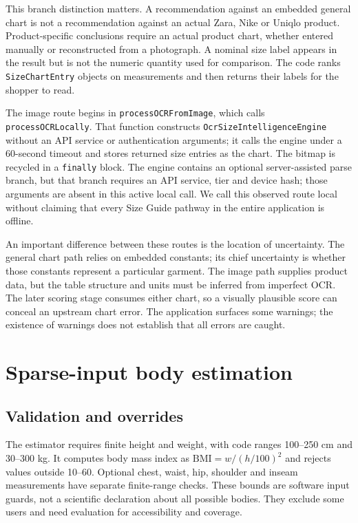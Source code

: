 \documentclass[11pt,a4paper]{article}
\begin{document}
This branch distinction matters. A recommendation against an embedded general chart is not a recommendation against an actual Zara, Nike or Uniqlo product. Product-specific conclusions require an actual product chart, whether entered manually or reconstructed from a photograph. A nominal size label appears in the result but is not the numeric quantity used for comparison. The code ranks \texttt{SizeChartEntry} objects on measurements and then returns their labels for the shopper to read.

The image route begins in \texttt{processOCRFromImage}, which calls \texttt{processOCRLocally}. That function constructs \texttt{OcrSizeIntelligenceEngine} without an API service or authentication arguments; it calls the engine under a 60-second timeout and stores returned size entries as the chart. The bitmap is recycled in a \texttt{finally} block. The engine contains an optional server-assisted parse branch, but that branch requires an API service, tier and device hash; those arguments are absent in this active local call. We call this observed route local without claiming that every Size Guide pathway in the entire application is offline.

An important difference between these routes is the location of uncertainty. The general chart path relies on embedded constants; its chief uncertainty is whether those constants represent a particular garment. The image path supplies product data, but the table structure and units must be inferred from imperfect OCR. The later scoring stage consumes either chart, so a visually plausible score can conceal an upstream chart error. The application surfaces some warnings; the existence of warnings does not establish that all errors are caught.

\section{Sparse-input body estimation}
\subsection{Validation and overrides}
The estimator requires finite height and weight, with code ranges 100--250 cm and 30--300 kg. It computes body mass index as $\mathrm{BMI}=w/(h/100)^2$ and rejects values outside 10--60. Optional chest, waist, hip, shoulder and inseam measurements have separate finite-range checks. These bounds are software input guards, not a scientific declaration about all possible bodies. They exclude some users and need evaluation for accessibility and coverage.
\end{document}
